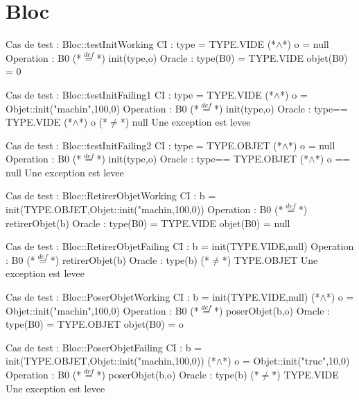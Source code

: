\documentclass[a4paper, 11pt, notitlepage]{report}
\begin{document}
\section{Bloc}
\begin{Test}

Cas de test  : Bloc::testInitWorking
CI : type = TYPE.VIDE (*$\land$*) o = null
Operation : B0 (*$\stackrel{def}{=}$*) init(type,o)
Oracle :
	type(B0) = TYPE.VIDE
	objet(B0) = 0

Cas de test  : Bloc::testInitFailing1
CI :  type = TYPE.VIDE (*$\land$*) o = Objet::init("machin",100,0)
Operation : B0 (*$\stackrel{def}{=}$*) init(type,o)
Oracle :
	type== TYPE.VIDE (*$\land$*) o (*$\ne$*) null
	Une exception est levee

Cas de test  : Bloc::testInitFailing2
CI :  type = TYPE.OBJET (*$\land$*) o = null
Operation : B0 (*$\stackrel{def}{=}$*) init(type,o)
Oracle :
	type== TYPE.OBJET (*$\land$*) o == null
	Une exception est levee

Cas de test : Bloc::RetirerObjetWorking
CI : b = init(TYPE.OBJET,Objet::init("machin,100,0))
Operation : B0 (*$\stackrel{def}{=}$*) retirerObjet(b)
Oracle :
	type(B0) = TYPE.VIDE
	objet(B0) = null

Cas de test : Bloc::RetirerObjetFailing
CI : b = init(TYPE.VIDE,null)
Operation : B0 (*$\stackrel{def}{=}$*) retirerObjet(b)
Oracle :
	type(b) (*$\ne$*) TYPE.OBJET
	Une exception est levee 

Cas de test : Bloc::PoserObjetWorking
CI : b = init(TYPE.VIDE,null) (*$\land$*) o = Objet::init("machin",100,0)
Operation : B0 (*$\stackrel{def}{=}$*) poserObjet(b,o)
Oracle :
	type(B0) = TYPE.OBJET
	objet(B0) = o

Cas de test : Bloc::PoserObjetFailing
CI : b = init(TYPE.OBJET,Objet::init("machin,100,0)) (*$\land$*) o = Objet::init("truc",10,0)
Operation : B0 (*$\stackrel{def}{=}$*) poserObjet(b,o)
Oracle :
	type(b) (*$\ne$*) TYPE.VIDE
	Une exception est levee 
\end{Test}
 
\end{document}
